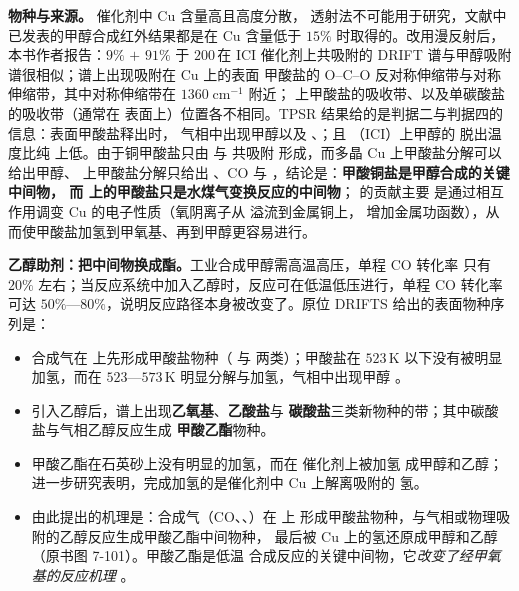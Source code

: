 \textbf{物种与来源。} 催化剂中 Cu 含量高且高度分散，
透射法不可能用于研究，文献中已发表的甲醇合成红外结果都是在 Cu 含量低于
$15\%$ 时取得的。改用漫反射后，
本书作者报告：$9\%$  $+$ $91\%$  于 $200$\,\degC 在 ICI
催化剂上共吸附的 DRIFT 谱与甲醇吸附谱很相似；谱上出现吸附在 Cu 上的表面
甲酸盐的 O--C--O 反对称伸缩带与对称伸缩带，其中对称伸缩带在
$1360\;\mathrm{cm^{-1}}$ 附近； 上甲酸盐的吸收带、以及单碳酸盐
的吸收带（通常在  表面上）位置各不相同。TPSR 结果给的是判据二与判据四的信息：表面甲酸盐释出时，
气相中出现甲醇以及 、；且 （ICI）上甲醇的
脱出温度比纯  上低。由于铜甲酸盐只由  与  共吸附
形成，而多晶 Cu 上甲酸盐分解可以给出甲醇、 上甲酸盐分解只给出
、CO 与 ，结论是：\textbf{甲酸铜盐是甲醇合成的关键中间物，
而  上的甲酸盐只是水煤气变换反应的中间物}； 的贡献主要
是通过相互作用调变 Cu 的电子性质（氧阴离子从  溢流到金属铜上，
增加金属功函数），从而使甲酸盐加氢到甲氧基、再到甲醇更容易进行。

\textbf{乙醇助剂：把中间物换成酯。}工业合成甲醇需高温高压，单程 CO 转化率
只有 $20\%$ 左右；当反应系统中加入乙醇时，反应可在低温低压进行，单程 CO
转化率可达 $50\%$—$80\%$，说明反应路径本身被改变了。原位 DRIFTS 给出的表面物种序列是：

\begin{itemize}
  \item 合成气在  上先形成甲酸盐物种（ 与
         两类）；甲酸盐在 $523$\,K 以下没有被明显加氢，而在
        $523$—$573$\,K 明显分解与加氢，气相中出现甲醇
        。
  \item 引入乙醇后，谱上出现\textbf{乙氧基}、\textbf{乙酸盐}与
        \textbf{碳酸盐}三类新物种的带；其中碳酸盐与气相乙醇反应生成
        \textbf{甲酸乙酯}物种。
  \item 甲酸乙酯在石英砂上没有明显的加氢，而在  催化剂上被加氢
        成甲醇和乙醇；进一步研究表明，完成加氢的是催化剂中 Cu 上解离吸附的
        氢。
  \item 由此提出的机理是：合成气（CO、、）在  上
        形成甲酸盐物种，与气相或物理吸附的乙醇反应生成甲酸乙酯中间物种，
        最后被 Cu 上的氢还原成甲醇和乙醇（原书图 7-101）。甲酸乙酯是低温
        合成反应的关键中间物，它\emph{改变了经甲氧基的反应机理}
        。
\end{itemize}


